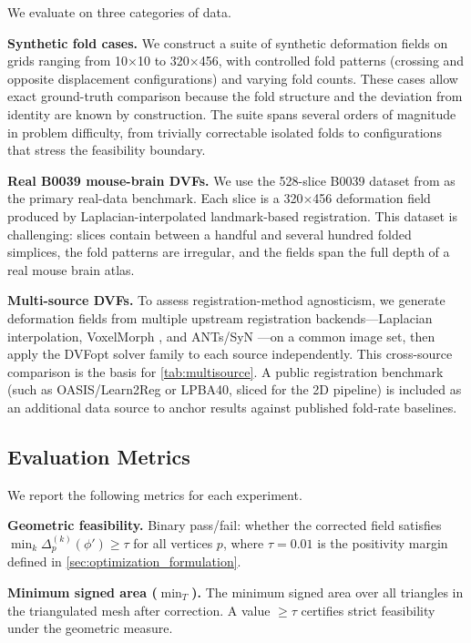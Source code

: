 We evaluate on three categories of data.

\textbf{Synthetic fold cases.} We construct a suite of synthetic deformation fields on grids ranging from 10$\times$10 to 320$\times$456, with controlled fold patterns (crossing and opposite displacement configurations) and varying fold counts. These cases allow exact ground-truth comparison because the fold structure and the deviation from identity are known by construction. The suite spans several orders of magnitude in problem difficulty, from trivially correctable isolated folds to configurations that stress the feasibility boundary.

\textbf{Real B0039 mouse-brain DVFs.} We use the 528-slice B0039 dataset from \cite{RegBoost2025} as the primary real-data benchmark. Each slice is a 320$\times$456 deformation field produced by Laplacian-interpolated landmark-based registration. This dataset is challenging: slices contain between a handful and several hundred folded simplices, the fold patterns are irregular, and the fields span the full depth of a real mouse brain atlas.

\textbf{Multi-source DVFs.} To assess registration-method agnosticism, we generate deformation fields from multiple upstream registration backends—Laplacian interpolation, VoxelMorph \cite{VoxelMorph2019}, and ANTs/SyN \cite{AVANTS200826}—on a common image set, then apply the DVFopt solver family to each source independently. This cross-source comparison is the basis for \autoref{tab:multisource}. A public registration benchmark (such as OASIS/Learn2Reg \cite{learn2reg2023} or LPBA40, sliced for the 2D pipeline) is included as an additional data source to anchor results against published fold-rate baselines.

\subsection{Evaluation Metrics}
\label{sec:metrics}

We report the following metrics for each experiment.

\textbf{Geometric feasibility.} Binary pass/fail: whether the corrected field satisfies $\min_k \Delta^{(k)}_p(\phi') \geq \tau$ for all vertices $p$, where $\tau = 0.01$ is the positivity margin defined in \autoref{sec:optimization_formulation}.

\textbf{Minimum signed area ($\min_T$).} The minimum signed area over all triangles in the triangulated mesh after correction. A value $\geq \tau$ certifies strict feasibility under the geometric measure.

